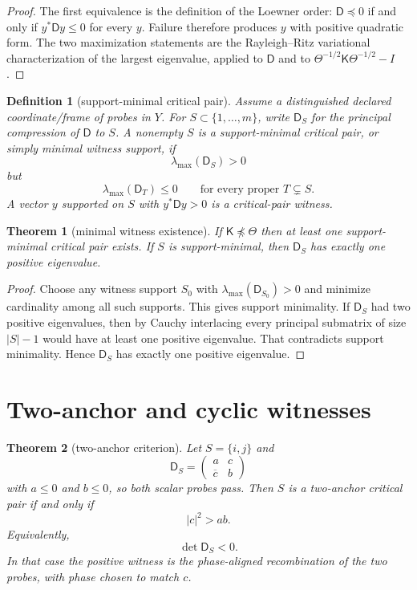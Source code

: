 \documentclass[11pt]{article}
\newtheorem{theorem}{Theorem}
\newtheorem{definition}{Definition}
\newcommand{\K}{\mathsf K}
\newcommand{\Th}{\Theta}
\newcommand{\Def}{\mathsf D}
\begin{document}
\begin{proof}
The first equivalence is the definition of the Loewner order: $\Def\preceq0$ if and only if $y^*\Def y\le0$ for every $y$.  Failure therefore produces $y$ with positive quadratic form.  The two maximization statements are the Rayleigh--Ritz variational characterization of the largest eigenvalue, applied to $\Def$ and to $\Th^{-1/2}\K\Th^{-1/2}-I$.
\end{proof}

\begin{definition}[support-minimal critical pair]
Assume a distinguished declared coordinate/frame of probes in $Y$.  For $S\subset\{1,\ldots,m\}$, write $\Def_S$ for the principal compression of $\Def$ to $S$.  A nonempty $S$ is a support-minimal critical pair, or simply minimal witness support, if
\[
  \lambda_{\max}(\Def_S)>0
\]
but
\[
  \lambda_{\max}(\Def_T)\le0
  \qquad
  \text{for every proper }T\subsetneq S.
\]
A vector $y$ supported on $S$ with $y^*\Def y>0$ is a critical-pair witness.
\end{definition}

\begin{theorem}[minimal witness existence]
If $\K\npreceq\Th$ then at least one support-minimal critical pair exists.  If $S$ is support-minimal, then $\Def_S$ has exactly one positive eigenvalue.
\end{theorem}

\begin{proof}
Choose any witness support $S_0$ with $\lambda_{\max}(\Def_{S_0})>0$ and minimize cardinality among all such supports.  This gives support minimality.  If $\Def_S$ had two positive eigenvalues, then by Cauchy interlacing every principal submatrix of size $|S|-1$ would have at least one positive eigenvalue.  That contradicts support minimality.  Hence $\Def_S$ has exactly one positive eigenvalue.
\end{proof}

\section{Two-anchor and cyclic witnesses}

\begin{theorem}[two-anchor criterion]
Let $S=\{i,j\}$ and
\[
  \Def_S=
  \begin{pmatrix}
    a & c\\
    \overline c & b
  \end{pmatrix}
\]
with $a\le0$ and $b\le0$, so both scalar probes pass.  Then $S$ is a two-anchor critical pair if and only if
\[
  |c|^2>ab .
\]
Equivalently,
\[
  \det \Def_S<0.
\]
In that case the positive witness is the phase-aligned recombination of the two probes, with phase chosen to match $c$.
\end{theorem}
\end{document}
